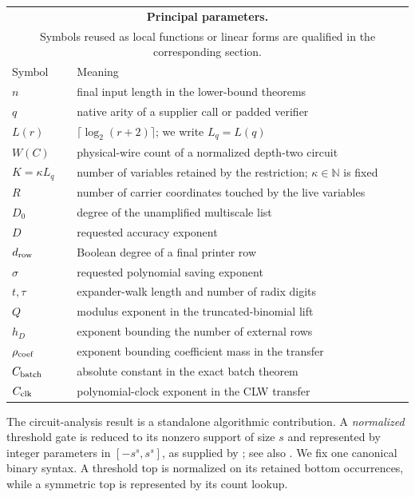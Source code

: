 \documentclass[11pt,letterpaper]{article}
\theoremstyle{definition}
\theoremstyle{remark}
\begin{document}
\begin{center}
\small
\begin{tabularx}{\textwidth}{@{}lX@{}}
\multicolumn{2}{c}{\textbf{Principal parameters.}}\\
\multicolumn{2}{c}{\footnotesize Symbols reused as local functions or linear
forms are qualified in the corresponding section.}\\[0.4em]
\toprule
Symbol & Meaning \\
\midrule
\(n\) & final input length in the lower-bound theorems \\
\(q\) & native arity of a supplier call or padded verifier \\
\(L(r)\) & \(\lceil\log_2(r+2)\rceil\); we write \(L_q=L(q)\) \\
\(W(C)\) & physical-wire count of a normalized depth-two circuit \\
\(K=\kappa L_q\) & number of variables retained by the restriction;
\(\kappa\in\mathbb N\) is fixed \\
\(R\) & number of carrier coordinates touched by the live variables \\
\(D_0\) & degree of the unamplified multiscale list \\
\(D\) & requested accuracy exponent \\
\(d_{\rm row}\) & Boolean degree of a final printer row \\
\(\sigma\) & requested polynomial saving exponent \\
\(t,\tau\) & expander-walk length and number of radix digits \\
\(Q\) & modulus exponent in the truncated-binomial lift \\
\(h_D\) & exponent bounding the number of external rows \\
\(\rho_{\rm coef}\) & exponent bounding coefficient mass in the transfer \\
\(C_{\rm batch}\) & absolute constant in the exact batch theorem \\
\(C_{\rm clk}\) & polynomial-clock exponent in the CLW transfer \\
\bottomrule
\end{tabularx}
\end{center}

The circuit-analysis result is a standalone algorithmic contribution. A
\emph{normalized} threshold gate is reduced to its nonzero support of size
\(s\) and represented by integer parameters in \([-s^s,s^s]\), as supplied
by \cite{MTT61}; see also \cite[Lemma 3.2]{CTW26}. We fix one canonical
binary syntax. A threshold top is normalized on its retained bottom
occurrences, while a symmetric top is represented by its count lookup.
\end{document}
